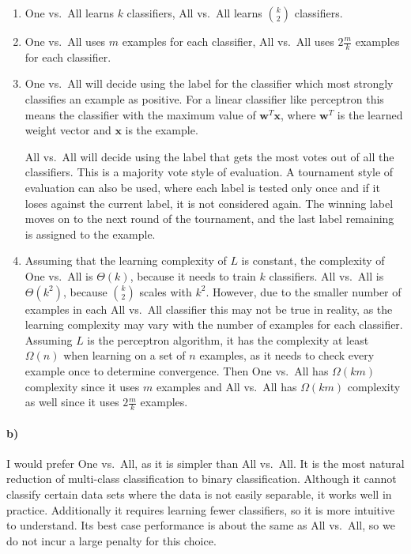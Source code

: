 \documentclass[12pt]{article}
\begin{document}
\begin{enumerate}
        \item One vs.\ All learns \(k\) classifiers, All vs.\ All learns \(\binom{k}{2}\) classifiers.
        \item One vs.\ All uses \(m\) examples for each classifier, All vs.\ All uses \(2\frac{m}{k}\) examples for each classifier.
        \item One vs.\ All will decide using the label for the classifier which most strongly classifies an example as positive. For a linear classifier
                like perceptron this means the classifier with the maximum value of \(\mathbf{w}^T\mathbf{x}\), where \(\mathbf{w}^T\) is the learned weight vector
                and \(\mathbf{x}\) is the example.

                All vs.\ All will decide using the label that gets the most votes out of all the classifiers. This is a majority vote style of evaluation. A tournament
                style of evaluation can also be used, where each label is tested only once and if it loses against the current label, it is not considered again. The winning
                label moves on to the next round of the tournament, and the last label remaining is assigned to the example.
        \item Assuming that the learning complexity of \(L\) is constant, the complexity of One vs.\ All is \(\Theta(k)\), because it needs to train \(k\) classifiers.
                All vs.\ All is \(\Theta(k^2)\), because \(\binom{k}{2}\) scales with \(k^2\). However, due to the smaller number of examples in each
                All vs.\ All classifier this may not be true in reality, as the learning complexity may vary with the number of examples for each classifier.
                Assuming \(L\) is the perceptron algorithm, it has the complexity at least \(\Omega(n)\) when learning on a set of \(n\) examples, as it needs
                to check every example once to determine convergence. Then One vs.\ All has \(\Omega(km)\) complexity since it uses \(m\) examples and All vs.\ All
                has \(\Omega(km)\) complexity as well since it uses \(2\frac{m}{k}\) examples.
\end{enumerate}

\paragraph{b)}

I would prefer One vs.\ All, as it is simpler than All vs.\ All. It is the most natural reduction of multi-class classification to binary classification. Although it cannot
classify certain data sets where the data is not easily separable, it works well in practice. Additionally it requires learning fewer classifiers, so it is more intuitive
to understand. Its best case performance is about the same as All vs.\ All, so we do not incur a large penalty for this choice.
\end{document}
